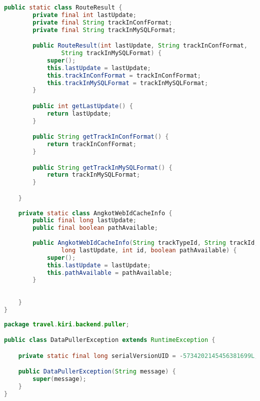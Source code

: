 \begin{lstlisting}[language=Java,basicstyle=\tiny,caption=DataPuller.java]
	public static class RouteResult {
		private final int lastUpdate;
		private final String trackInConfFormat;
		private final String trackInMySQLFormat;

		public RouteResult(int lastUpdate, String trackInConfFormat,
				String trackInMySQLFormat) {
			super();
			this.lastUpdate = lastUpdate;
			this.trackInConfFormat = trackInConfFormat;
			this.trackInMySQLFormat = trackInMySQLFormat;
		}

		public int getLastUpdate() {
			return lastUpdate;
		}

		public String getTrackInConfFormat() {
			return trackInConfFormat;
		}

		public String getTrackInMySQLFormat() {
			return trackInMySQLFormat;
		}

	}
	
	private static class AngkotWebIdCacheInfo {
		public final long lastUpdate;
		public final boolean pathAvailable;
		
		public AngkotWebIdCacheInfo(String trackTypeId, String trackId,
				long lastUpdate, int id, boolean pathAvailable) {
			super();
			this.lastUpdate = lastUpdate;
			this.pathAvailable = pathAvailable;
		}
		
		
	}
}
\end{lstlisting}

\singlespacing 
%
%
\begin{lstlisting}[language=Java,basicstyle=\tiny,caption=DataPullerException.java]
package travel.kiri.backend.puller;

public class DataPullerException extends RuntimeException {

	private static final long serialVersionUID = -5734202145456381699L;

	public DataPullerException(String message) {
		super(message);
	}
}
\end{lstlisting}